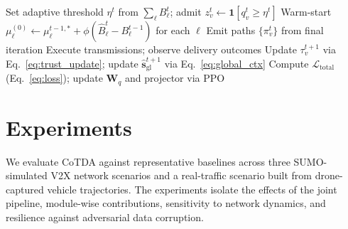 \documentclass[final,3p,times,review,sort&compress]{elsarticle}
\begin{document}
\begin{algorithm}[t!]\linespread{1}\selectfont
\caption{CoTDA: per-slot update}
\label{alg:slot}
\DontPrintSemicolon
\SetAlgoLined
{}
Set adaptive threshold $\eta^t$ from $\sum_\ell B_\ell^t$; admit $z_v^t\gets\mathbf{1}[q_v^t \geq \eta^t]$\;
Warm-start $\mu_\ell^{(0)} \gets \mu_\ell^{t-1,*} + \phi(\hat{B}_\ell^t - B_\ell^{t-1})$ for each $\ell$\;
Emit paths $\{\pi_v^t\}$ from final iteration\;
Execute transmissions; observe delivery outcomes\;
Update $\tau_v^{t+1}$ via Eq.~\ref{eq:trust_update}; update $\hat{\mathbf{s}}_{\mathrm{gl}}^{t+1}$ via Eq.~\ref{eq:global_ctx}\;
Compute $\mathcal{L}_{\mathrm{total}}$ (Eq.~\ref{eq:loss}); update $\mathbf{W}_q$ and projector via PPO\;
\end{algorithm}

\section{Experiments}
\label{sec:experiments}

We evaluate CoTDA against representative baselines across three SUMO-simulated V2X network scenarios and a real-traffic scenario built from drone-captured vehicle trajectories. The experiments isolate the effects of the joint pipeline, module-wise contributions, sensitivity to network dynamics, and resilience against adversarial data corruption.
\end{document}
